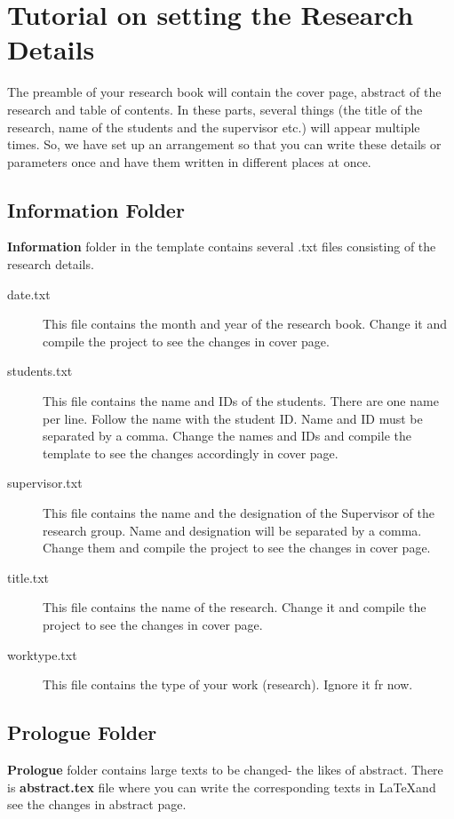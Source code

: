 \chapter{Tutorial on setting the Research Details}\label{chap:param}

The preamble of your research book will contain the cover page, abstract of the research and table of contents. In these parts, several things (the title of the research, name of the students and the supervisor etc.) will appear multiple times. So, we have set up an arrangement so that you can write these details or parameters once and have them written in different places at once.

\section{Information Folder}
\textbf{Information} folder in the template contains several .txt files consisting of the research details.
\begin{description}

\item [date.txt] This file contains the month and year of the research book. Change it and compile the project to see the changes in cover page.

\item [students.txt] This file contains the name and IDs of the students. There are one name per line. Follow the name with the student ID. Name and ID must be separated by a comma. Change the names and IDs and compile the template to see the changes accordingly in cover page.

\item [supervisor.txt] This file contains the name and the designation of the Supervisor of the research group. Name and designation will be separated by a comma. Change them and compile the project to see the changes in cover page.

\item [title.txt] This file contains the name of the research. Change it and compile the project to see the changes in cover page. 

\item [worktype.txt] This file contains the type of your work (research). Ignore it fr now.
\end{description}

\section{Prologue Folder}
\textbf{Prologue} folder contains large texts to be changed- the likes of abstract. There is \textbf{abstract.tex} file where you can write the corresponding texts in \LaTeX and see the changes in abstract page. 
\endinput
